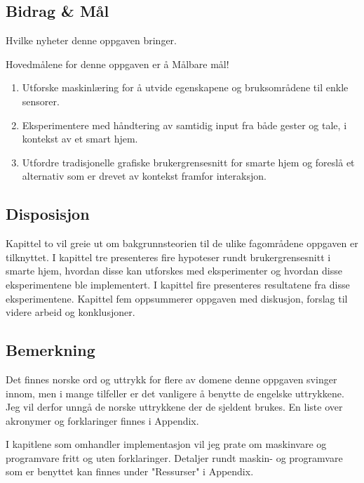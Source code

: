 \subsection*{Bidrag \& Mål}
{\color{red}Hvilke nyheter denne oppgaven bringer.}

Hovedmålene for denne oppgaven er å {\color{red} Målbare mål!}
\begin{enumerate}
\item Utforske maskinlæring for å utvide egenskapene og bruksområdene til enkle sensorer.
\item Eksperimentere med håndtering av samtidig input fra både gester og tale, i kontekst av et smart hjem.
\item Utfordre tradisjonelle grafiske brukergrensesnitt for smarte hjem og foreslå et alternativ som er drevet av kontekst framfor interaksjon.
\end{enumerate}

\subsection*{Disposisjon}
Kapittel to vil greie ut om bakgrunnsteorien til de ulike fagområdene oppgaven er tilknyttet. I kapittel tre presenteres fire hypoteser rundt brukergrensesnitt i smarte hjem, hvordan disse kan utforskes med eksperimenter og hvordan disse eksperimentene ble implementert. I kapittel fire presenteres resultatene fra disse eksperimentene. Kapittel fem oppsummerer oppgaven med diskusjon, forslag til videre arbeid og konklusjoner.  

\subsection*{Bemerkning}
Det finnes norske ord og uttrykk for flere av domene denne oppgaven svinger innom, men i mange tilfeller er det vanligere å benytte de engelske uttrykkene. Jeg vil derfor unngå de norske uttrykkene der de sjeldent brukes. En liste over akronymer og forklaringer finnes i Appendix.

I kapitlene som omhandler implementasjon vil jeg prate om maskinvare og programvare fritt og uten forklaringer. Detaljer rundt maskin- og programvare som er benyttet kan finnes under "Ressurser" i Appendix.